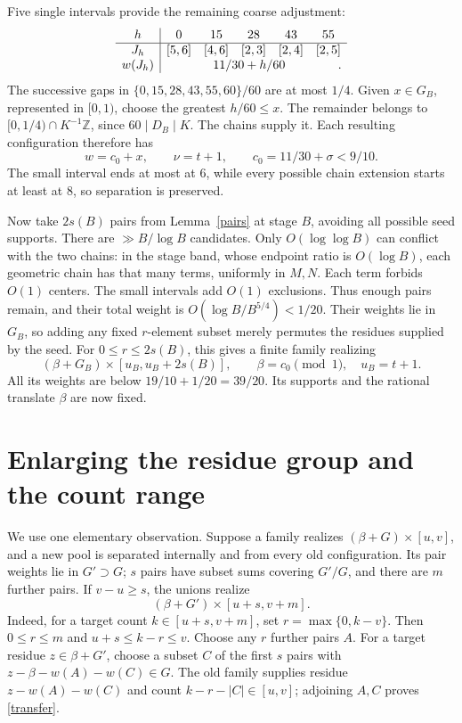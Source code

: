 \documentclass[11pt]{article}
\newcommand{\Z}{\mathbb Z}
\begin{document}
Five single intervals provide the remaining coarse adjustment:
\[
\begin{array}{c|ccccc}
 h&0&15&28&43&55\\ \hline
 J_h &[5,6]&[4,6]&[2,3]&[2,4]&[2,5]\\
 w(J_h)&\multicolumn{5}{c}{11/30+h/60}.
\end{array}
\]
The successive gaps in \(\{0,15,28,43,55,60\}/60\) are at most
\(1/4\). Given \(x\in G_B\), represented in \([0,1)\), choose
the greatest \(h/60\le x\). The remainder belongs to
\([0,1/4)\cap K^{-1}\Z\), since \(60\mid D_B\mid K\).
The chains supply it. Each resulting configuration therefore has
\[
                  w=c_0+x,\qquad \nu=t+1,
       \qquad c_0=11/30+\sigma<9/10.
\]
The small interval ends at most at \(6\), while every possible
chain extension starts at least at \(8\), so separation is preserved.

Now take \(2s(B)\) pairs from Lemma~\ref{pairs} at stage \(B\),
avoiding all possible seed supports.
There are \(\gg B/\log B\) candidates. Only \(O(\log\log B)\)
can conflict with the two chains: in the stage band, whose endpoint
ratio is \(O(\log B)\), each geometric chain has that many terms,
uniformly in \(M,N\). Each term forbids \(O(1)\) centers.
The small intervals add \(O(1)\) exclusions.
Thus enough pairs remain, and their total weight is
\(O(\log B/B^{5/4})<1/20\).
Their weights lie in \(G_B\), so adding any fixed \(r\)-element
subset merely permutes the residues supplied by the seed.
For \(0\le r\le2s(B)\), this gives a finite family realizing
\begin{equation}\label{initial}
      (\beta+G_B)\times[u_B,u_B+2s(B)],
      \qquad \beta=c_0\pmod1,\quad u_B=t+1.
\end{equation}
All its weights are below \(19/10+1/20=39/20\).
Its supports and the rational translate \(\beta\) are now fixed.

\section{Enlarging the residue group and the count range}

We use one elementary observation. Suppose a family realizes
\((\beta+G)\times[u,v]\), and a new pool is separated internally
and from every old configuration. Its pair weights lie in
\(G'\supset G\); \(s\) pairs have subset sums covering \(G'/G\),
and there are \(m\) further pairs.
If \(v-u\ge s\), the unions realize
\begin{equation}\label{transfer}
                    (\beta+G')\times[u+s,v+m].
\end{equation}
Indeed, for a target count \(k\in[u+s,v+m]\), set
\(r=\max\{0,k-v\}\). Then \(0\le r\le m\) and
\(u+s\le k-r\le v\).
Choose any \(r\) further pairs \(A\).
For a target residue \(z\in\beta+G'\), choose a subset \(C\)
of the first \(s\) pairs with \(z-\beta-w(A)-w(C)\in G\).
The old family supplies residue \(z-w(A)-w(C)\) and count
\(k-r-|C|\in[u,v]\); adjoining \(A,C\) proves \eqref{transfer}.
\end{document}

